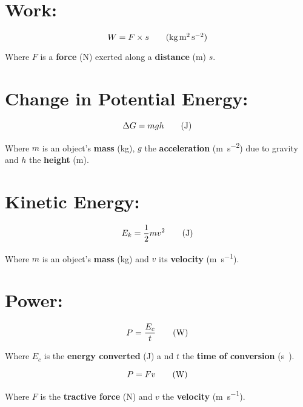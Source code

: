 \documentclass[11pt]{article}
\newcommand\textcenter[1]{
	\begin{center}
	#1
	\end{center}
}
\begin{document}
\section{Work: }

\begin{center}
	\begin{equation}
		W = F\times s\tag{\si{\kilogram\meter\squared\per\second\squared}}
	\end{equation}
\textcenter{Where $F$ is a \textbf{force} (\si{\newton})  exerted along a \textbf{distance} (\si{\meter}) $ s $.}
\end{center}


\section{Change in Potential Energy: }

	\begin{equation}
		\Delta G = mgh\tag{\si{\joule}}
	\end{equation}
\textcenter{Where $m$ is an object's \textbf{mass} (\si{\kilogram}), $g$ the \textbf{acceleration} (\si{\meter\per\second\squared}) due to gravity and $h$ the \textbf{height} (\si{\meter}).}

\section{Kinetic Energy: }
\begin{equation}
	E_k = \frac{1}{2} mv^2\tag{\si{\joule}}
\end{equation}

\textcenter{Where $m$ is an object's \textbf{mass} (\si{\kilogram}) and $v$ its \textbf{velocity} (\si{\meter\per\second}).}

\section{Power: }

\begin{multicols}{2}
	\begin{equation}
	P = \frac{E_c}{t}\tag{\si{\watt}}
\end{equation}

\textcenter{Where $E_c$ is the \textbf{energy converted} (\si{\joule}) a nd $t$ the \textbf{time of conversion} (\si\second).}

\begin{equation}
	P = Fv\tag{\si{\watt}}
\end{equation}
\textcenter{Where $F$ is the \textbf{tractive force} (\si{\newton}) and $v$ the \textbf{velocity} (\si{\meter\per\second }).}
\end{multicols}
\end{document}
